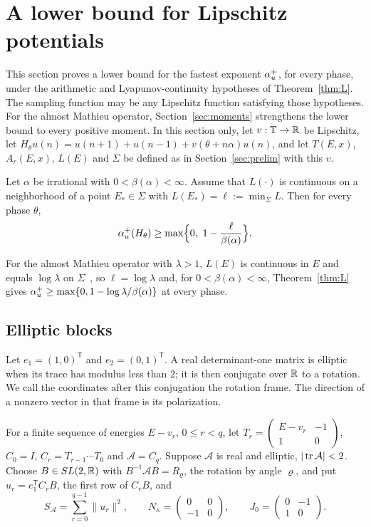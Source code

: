 \section{A lower bound for Lipschitz potentials}\label{sec:lower}

This section proves a lower bound for the fastest exponent $\alpha_u^+$, for every phase, under the arithmetic and Lyapunov-continuity hypotheses of Theorem~\ref{thm:L}. The sampling function may be any Lipschitz function satisfying those hypotheses. For the almost Mathieu operator, Section~\ref{sec:moments} strengthens the lower bound to every positive moment. In this section only, let $v:\mathbb T\to\mathbb R$ be Lipschitz, let $H_\theta u(n)=u(n+1)+u(n-1)+v(\theta+n\alpha)u(n)$, and let $T(E,x)$, $A_r(E,x)$, $L(E)$ and $\Sigma$ be defined as in Section~\ref{sec:prelim} with this $v$.

\begin{theorem}\label{thm:L}
Let $\alpha$ be irrational with $0<\beta(\alpha)<\infty$. Assume that $L(\cdot)$ is continuous on a neighborhood of a point $E_*\in\Sigma$ with $L(E_*)=\ell:=\min_\Sigma L$. Then for every phase $\theta$,
\[
\au(H_\theta)\ge\max\Bigl\{0,\ 1-\frac{\ell}{\beta(\alpha)}\Bigr\}.
\]
\end{theorem}

For the almost Mathieu operator with $\lambda>1$, $L(E)$ is continuous in $E$ and equals $\log\lambda$ on $\Sigma$~\cite[Theorem~1 and Corollary~2]{BourgainJitomirskaya2002}, so $\ell=\log\lambda$ and, for $0<\beta(\alpha)<\infty$, Theorem~\ref{thm:L} gives $\alpha_u^+\ge\max\{0,1-\log\lambda/\beta(\alpha)\}$ at every phase.

\subsection{Elliptic blocks}

Let $e_1=(1,0)^{\mathsf T}$ and $e_2=(0,1)^{\mathsf T}$. A real determinant-one matrix is elliptic when its trace has modulus less than $2$; it is then conjugate over $\mathbb R$ to a rotation. We call the coordinates after this conjugation the rotation frame. The direction of a nonzero vector in that frame is its polarization.

For a finite sequence of energies $E-v_r$, $0\le r<q$, let $T_r=\begin{pmatrix}E-v_r&-1\\1&0\end{pmatrix}$, $C_0=I$, $C_r=T_{r-1}\cdots T_0$ and $\mathcal A=C_q$. Suppose $\mathcal A$ is real and elliptic, $|\operatorname{tr}\mathcal A|<2$. Choose $B\in SL(2,\mathbb R)$ with $B^{-1}\mathcal AB=R_\varrho$, the rotation by angle $\varrho$, and put $u_r=e_1^{\mathsf T}C_rB$, the first row of $C_rB$, and
\[
S_{\mathcal A}=\sum_{r=0}^{q-1}\|u_r\|^2,\qquad N_\kappa=\begin{pmatrix}0&0\\-1&0\end{pmatrix},\qquad J_0=\begin{pmatrix}0&-1\\1&0\end{pmatrix}.
\]

